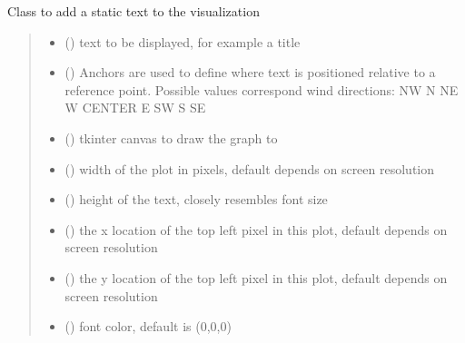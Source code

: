 \documentclass[letterpaper,10pt,english]{sphinxmanual}
\begin{document}
\begin{fulllineitems}
\sphinxAtStartPar
Class to add a static text to the visualization
\begin{quote}\begin{description}
\begin{itemize}
\item {} 
\sphinxAtStartPar
{} () \textendash{} text to be displayed, for example a title

\item {} 
\sphinxAtStartPar
{} () \textendash{} Anchors are used to define where text is positioned relative to a reference point. Possible values correspond wind directions:
NW
N
NE
W
CENTER
E
SW
S
SE

\item {} 
\sphinxAtStartPar
{} () \textendash{} tkinter canvas to draw the graph to

\item {} 
\sphinxAtStartPar
{} () \textendash{} width of the plot in pixels, default depends on screen resolution

\item {} 
\sphinxAtStartPar
{} () \textendash{} height of the text, closely resembles font size

\item {} 
\sphinxAtStartPar
{} () \textendash{} the x location of the top left pixel in this plot, default depends on screen resolution

\item {} 
\sphinxAtStartPar
{} () \textendash{} the y location of the top left pixel in this plot, default depends on screen resolution

\item {} 
\sphinxAtStartPar
{} () \textendash{} font color, default is (0,0,0)


\end{itemize}
\end{description}
\end{quote}
\end{fulllineitems}
\end{document}
